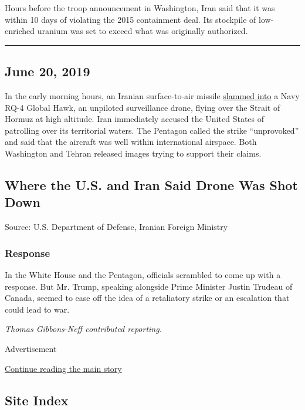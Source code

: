 Hours before the troop announcement in Washington, Iran said that it was
within 10 days of violating the 2015 containment deal. Its stockpile of
low-enriched uranium was set to exceed what was originally authorized.

\begin{center}\rule{0.5\linewidth}{\linethickness}\end{center}

\hypertarget{june-20-2019}{%
\subsection{June 20, 2019}\label{june-20-2019}}

In the early morning hours, an Iranian surface-to-air missile
\href{https://www.nytimes.com/2019/06/20/world/middleeast/iran-us-drone.html}{slammed
into} a Navy RQ-4 Global Hawk, an unpiloted surveillance drone, flying
over the Strait of Hormuz at high altitude. Iran immediately accused the
United States of patrolling over its territorial waters. The Pentagon
called the strike ``unprovoked'' and said that the aircraft was well
within international airspace. Both Washington and Tehran released
images trying to support their claims.

\hypertarget{where-the-us-and-iran-said-drone-was-shot-down}{%
\subsection{Where the U.S. and Iran Said Drone Was Shot
Down}\label{where-the-us-and-iran-said-drone-was-shot-down}}

Source: U.S. Department of Defense, Iranian Foreign Ministry

\hypertarget{response-7}{%
\subsubsection{Response}\label{response-7}}

In the White House and the Pentagon, officials scrambled to come up with
a response. But Mr. Trump, speaking alongside Prime Minister Justin
Trudeau of Canada, seemed to ease off the idea of a retaliatory strike
or an escalation that could lead to war.

\emph{Thomas Gibbons-Neff contributed reporting.}

Advertisement

\protect\hyperlink{after-bottom}{Continue reading the main story}

\hypertarget{site-index}{%
\subsection{Site Index}\label{site-index}}


